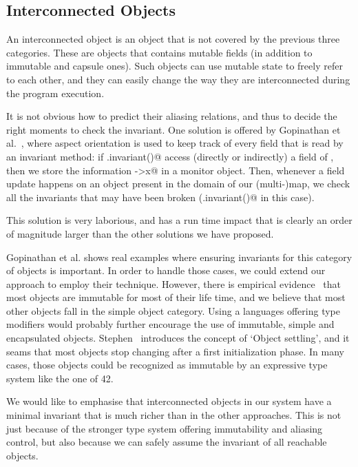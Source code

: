 \saveSpace
\subsection{Interconnected Objects}
\label{s:interconnected}
\saveSpace
An interconnected object is an object that is not covered by the previous three categories.
These are objects that contains mutable fields (in addition to immutable and capsule ones).
Such objects can use mutable state to freely refer to each other, and they can easily change the way they are interconnected during the program execution.

It is not obvious how to predict their aliasing relations, and thus to decide the right moments to check the invariant.
One solution is offered by Gopinathan et al.~\cite{Gopinathan:2008:RMO:1483018.1483028}, where aspect orientation is used to keep track of every field that is read by an invariant method:
if \Q@x.invariant()@ access (directly or indirectly) a field of \Q@y@, then we store the information \Q@y->x@ in a monitor object.
Then, whenever a field update happens on an object present in the domain of our (multi-)map, we check all the invariants that may have been broken (\Q@x.invariant()@ in this case).

This solution is very laborious, and has a run time impact that is clearly an order of magnitude larger than the other solutions we have proposed.

Gopinathan et al. shows real examples
where ensuring invariants for this category of objects is important. In order to handle those cases, we could extend our approach to employ their technique.
However, there is empirical evidence~\cite{nelson2012profiling,nelson2012Thesis} 
that most objects are immutable for most of their life time,
and  we believe that most other objects fall in the simple object category.
Using a languages offering type modifiers would probably
further encourage the use of immutable, simple and encapsulated objects.
Stephen~\cite{nelson2012Thesis}  introduces the concept of `Object settling',
and it seams that most objects stop changing after a first initialization phase.
In many cases, those objects could be recognized as immutable
by an expressive type system like the one of 42.

We would like to emphasise that interconnected objects in our system have
a minimal invariant that is much richer than in the other approaches.
This is not just because of the stronger type system offering immutability
and aliasing control, but also because we can safely assume the invariant of all reachable objects.
\saveSpace
